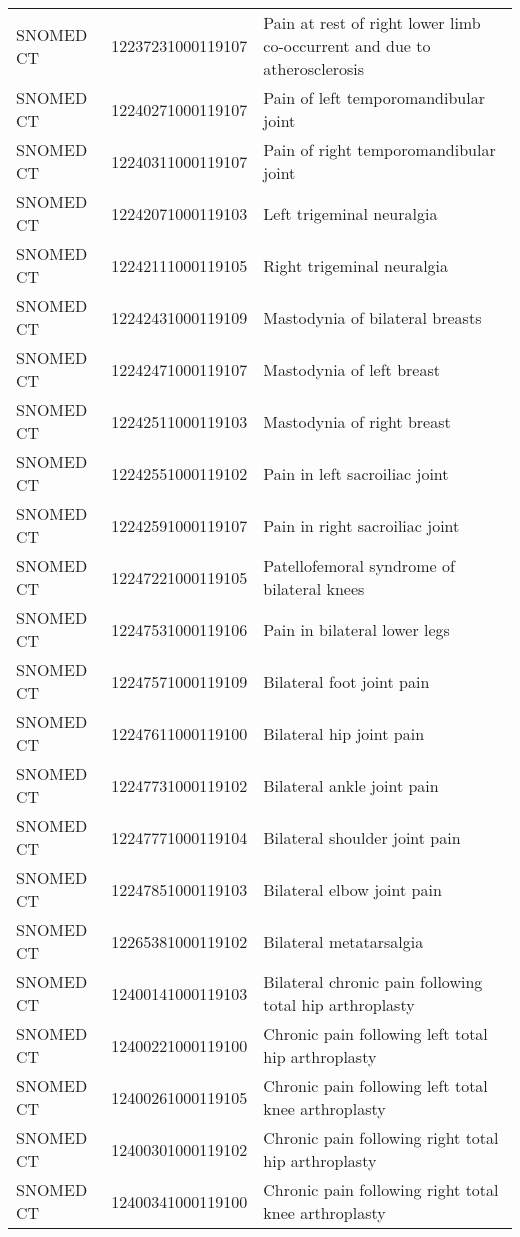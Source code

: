 \begin{longtable}{p{}p{}p{}}
  SNOMED CT & 12237231000119107 & Pain at rest of right lower limb co-occurrent and due to atherosclerosis \\ 
  SNOMED CT & 12240271000119107 & Pain of left temporomandibular joint \\ 
  SNOMED CT & 12240311000119107 & Pain of right temporomandibular joint \\ 
  SNOMED CT & 12242071000119103 & Left trigeminal neuralgia \\ 
  SNOMED CT & 12242111000119105 & Right trigeminal neuralgia \\ 
  SNOMED CT & 12242431000119109 & Mastodynia of bilateral breasts \\ 
  SNOMED CT & 12242471000119107 & Mastodynia of left breast \\ 
  SNOMED CT & 12242511000119103 & Mastodynia of right breast \\ 
  SNOMED CT & 12242551000119102 & Pain in left sacroiliac joint \\ 
  SNOMED CT & 12242591000119107 & Pain in right sacroiliac joint \\ 
  SNOMED CT & 12247221000119105 & Patellofemoral syndrome of bilateral knees \\ 
  SNOMED CT & 12247531000119106 & Pain in bilateral lower legs \\ 
  SNOMED CT & 12247571000119109 & Bilateral foot joint pain \\ 
  SNOMED CT & 12247611000119100 & Bilateral hip joint pain \\ 
  SNOMED CT & 12247731000119102 & Bilateral ankle joint pain \\ 
  SNOMED CT & 12247771000119104 & Bilateral shoulder joint pain \\ 
  SNOMED CT & 12247851000119103 & Bilateral elbow joint pain \\ 
  SNOMED CT & 12265381000119102 & Bilateral metatarsalgia \\ 
  SNOMED CT & 12400141000119103 & Bilateral chronic pain following total hip arthroplasty \\ 
  SNOMED CT & 12400221000119100 & Chronic pain following left total hip arthroplasty \\ 
  SNOMED CT & 12400261000119105 & Chronic pain following left total knee arthroplasty \\ 
  SNOMED CT & 12400301000119102 & Chronic pain following right total hip arthroplasty \\ 
  SNOMED CT & 12400341000119100 & Chronic pain following right total knee arthroplasty \\ 

\end{longtable}
